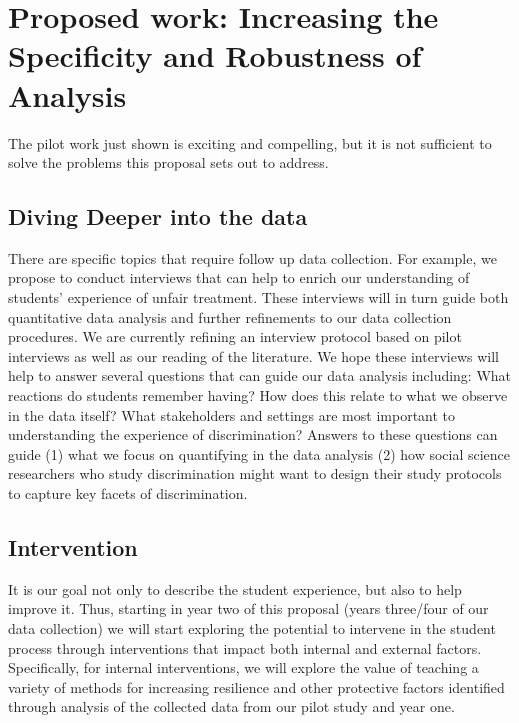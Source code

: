 \section{Proposed work: Increasing the Specificity and Robustness of Analysis}
The pilot work just shown is exciting and compelling, but it is not sufficient to solve the problems this proposal sets out to address. 



\subsection{Diving Deeper into the data}
There are specific topics that require follow up data collection. For example, we propose to conduct interviews that can help to enrich our understanding of students’ experience of unfair treatment. These interviews will in turn guide both quantitative data analysis and further refinements to our data collection procedures. We are currently refining an interview protocol based on pilot interviews as well as our reading of the literature. We hope these interviews will help to answer several questions that can guide our data analysis including:
What reactions do students remember having? How does this relate to what we observe in the data itself? 
What stakeholders and settings are most important to understanding the experience of discrimination? 
Answers to these questions can guide (1) what we focus on quantifying in the data analysis (2) how social science researchers who study discrimination might want to design their study protocols to capture key facets of discrimination.


\subsection{Intervention}
It is our goal not only to describe the student experience, but also to help improve it. Thus, starting in year two of this proposal (years three/four of our data collection) we will start exploring the potential to intervene in the student process through interventions that impact both internal and external factors. Specifically, for internal interventions, we will explore the value of teaching a variety of methods for increasing resilience and other protective factors identified through analysis of the collected data from our pilot study and year one.


